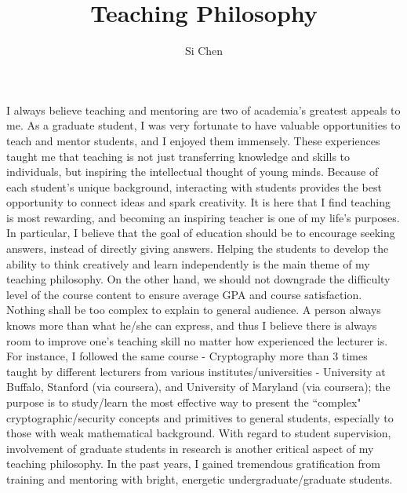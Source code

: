 \documentclass[11pt]{article}
\begin{document}
\title{Teaching Philosophy}
\author{Si Chen}
\date{}
\maketitle

\section*{} 

I always believe teaching and mentoring are two of academia's greatest appeals to me. As a graduate student, I was very fortunate to have valuable opportunities to teach and mentor students, and I enjoyed them immensely. These experiences taught me that teaching is not just transferring knowledge and skills to individuals, but inspiring the intellectual thought of young minds. Because of each student's unique background, interacting with students provides the best opportunity to connect ideas and spark creativity. It is here that I find teaching is most rewarding, and becoming an inspiring teacher is one of my life's purposes. In particular, I believe that the goal of education should be to encourage seeking answers, instead of directly giving answers. Helping the students to develop the ability to think creatively and learn independently is the main theme of my teaching philosophy. On the other hand, we should not downgrade the difficulty level of the course content to ensure average GPA and course satisfaction. Nothing shall be too complex to explain to general audience. A person always knows more than what he/she can express, and thus I believe there is always room to improve one's teaching skill no matter how experienced the lecturer is. For instance, I followed the same course - Cryptography more than 3 times taught by different lecturers from various institutes/universities - University at Buffalo, Stanford (via coursera), and University of Maryland (via coursera); the purpose is to study/learn the most effective way to present the ``complex" cryptographic/security concepts and primitives to general students, especially to those with weak mathematical background. With regard to student supervision, involvement of graduate students in research is another critical aspect of my teaching philosophy. In the past years, I gained tremendous gratification from training and mentoring with bright, energetic undergraduate/graduate students. 
\end{document}
